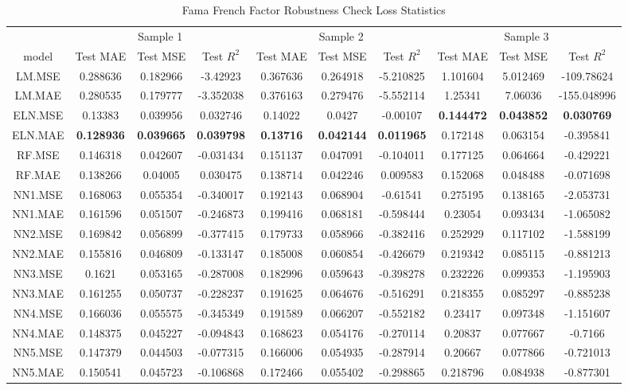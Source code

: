 \begin{table}

\caption{\label{tab:}Fama French Factor Robustness Check Loss Statistics}
\centering
\fontsize{6}{8}\selectfont
\begin{tabular}[t]{cccccccccc}
\toprule
\multicolumn{1}{c}{ } & \multicolumn{3}{c}{Sample 1} & \multicolumn{3}{c}{Sample 2} & \multicolumn{3}{c}{Sample 3} \\
\cmidrule(l{3pt}r{3pt}){2-4} \cmidrule(l{3pt}r{3pt}){5-7} \cmidrule(l{3pt}r{3pt}){8-10}
model & Test MAE & Test MSE & Test $R^2$ & Test MAE & Test MSE & Test $R^2$ & Test MAE & Test MSE & Test $R^2$\\
\midrule
LM.MSE & 0.288636 & 0.182966 & -3.42923 & 0.367636 & 0.264918 & -5.210825 & 1.101604 & 5.012469 & -109.78624\\
LM.MAE & 0.280535 & 0.179777 & -3.352038 & 0.376163 & 0.279476 & -5.552114 & 1.25341 & 7.06036 & -155.048996\\
ELN.MSE & 0.13383 & 0.039956 & 0.032746 & 0.14022 & 0.0427 & -0.00107 & \textbf{0.144472} & \textbf{0.043852} & \textbf{0.030769}\\
ELN.MAE & \textbf{0.128936} & \textbf{0.039665} & \textbf{0.039798} & \textbf{0.13716} & \textbf{0.042144} & \textbf{0.011965} & 0.172148 & 0.063154 & -0.395841\\
RF.MSE & 0.146318 & 0.042607 & -0.031434 & 0.151137 & 0.047091 & -0.104011 & 0.177125 & 0.064664 & -0.429221\\
RF.MAE & 0.138266 & 0.04005 & 0.030475 & 0.138714 & 0.042246 & 0.009583 & 0.152068 & 0.048488 & -0.071698\\
NN1.MSE & 0.168063 & 0.055354 & -0.340017 & 0.192143 & 0.068904 & -0.61541 & 0.275195 & 0.138165 & -2.053731\\
NN1.MAE & 0.161596 & 0.051507 & -0.246873 & 0.199416 & 0.068181 & -0.598444 & 0.23054 & 0.093434 & -1.065082\\
NN2.MSE & 0.169842 & 0.056899 & -0.377415 & 0.179733 & 0.058966 & -0.382416 & 0.252929 & 0.117102 & -1.588199\\
NN2.MAE & 0.155816 & 0.046809 & -0.133147 & 0.185008 & 0.060854 & -0.426679 & 0.219342 & 0.085115 & -0.881213\\
NN3.MSE & 0.1621 & 0.053165 & -0.287008 & 0.182996 & 0.059643 & -0.398278 & 0.232226 & 0.099353 & -1.195903\\
NN3.MAE & 0.161255 & 0.050737 & -0.228237 & 0.191625 & 0.064676 & -0.516291 & 0.218355 & 0.085297 & -0.885238\\
NN4.MSE & 0.166036 & 0.055575 & -0.345349 & 0.191589 & 0.066207 & -0.552182 & 0.23417 & 0.097348 & -1.151607\\
NN4.MAE & 0.148375 & 0.045227 & -0.094843 & 0.168623 & 0.054176 & -0.270114 & 0.20837 & 0.077667 & -0.7166\\
NN5.MSE & 0.147379 & 0.044503 & -0.077315 & 0.166006 & 0.054935 & -0.287914 & 0.20667 & 0.077866 & -0.721013\\
NN5.MAE & 0.150541 & 0.045723 & -0.106868 & 0.172466 & 0.055402 & -0.298865 & 0.218796 & 0.084938 & -0.877301\\
\bottomrule
\end{tabular}
\end{table}